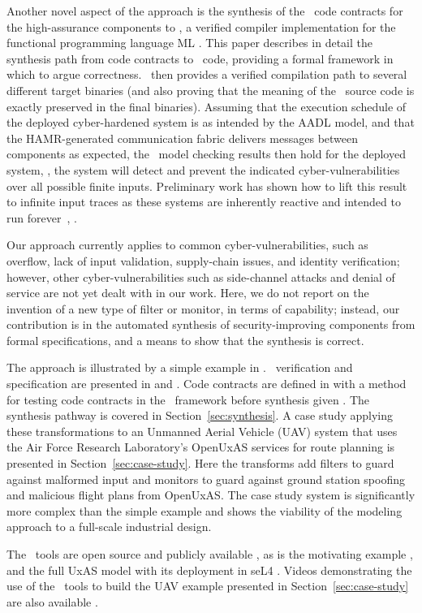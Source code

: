 Another novel aspect of the approach is the synthesis of the \agr\ 
code contracts for the high-assurance components to \ckml, a verified
compiler implementation for the functional programming language
ML \cite{cakeml}. This paper describes in detail the synthesis path
from code contracts to \ckml\ code, providing a formal framework in
which to argue correctness. \ckml\ then provides a verified
compilation path to several different target binaries (and also
proving that the meaning of the \ckml\ source code is exactly
preserved in the final binaries). Assuming that the execution schedule
of the deployed cyber-hardened system is as intended by the AADL
model, and that the HAMR-generated communication fabric delivers
messages between components as expected, the \agr\ model checking
results then hold for the deployed system, \ie, the system will detect
and prevent the indicated cyber-vulnerabilities over all possible
finite inputs. Preliminary work has shown how to lift this result to
infinite input traces as these systems are inherently reactive and
intended to run forever~\cite{case-verified-filter}, \cite{cakeml-space-cost}.

Our approach currently applies to common cyber-vulnerabilities, such
as overflow, lack of input validation, supply-chain issues, and
identity verification; however, other cyber-vulnerabilities such as
side-channel attacks and denial of service are not yet dealt with in
our work.  Here, we do not report on the invention of a new type of
filter or monitor, in terms of capability; instead, our contribution
is in the automated synthesis of security-improving components from
formal specifications, and a means to show that the synthesis is
correct.

The approach is illustrated by a simple example in
. \agr\ verification and specification are
presented in  and .
Code contracts are defined in  with a method
for testing code contracts in the \agr\ framework before synthesis given
\secref{sec:testing}.
The synthesis pathway is covered in Section~\ref{sec:synthesis}. A
case study applying these transformations to an Unmanned Aerial
Vehicle (UAV) system that uses the Air Force Research Laboratory's
OpenUxAS services for route planning is presented in
Section~\ref{sec:case-study}. Here the transforms add filters to guard
against malformed input and monitors to guard against ground station
spoofing and malicious flight plans from OpenUxAS. The case study
system is significantly more complex than the simple example and shows
the viability of the modeling approach to a full-scale industrial
design.

The \brfcs\ tools are open source and publicly
available \cite{fmide}, as is the motivating example \cite{repo}, and
the full UxAS model with its deployment in seL4 \cite{phase2, camkes}.
Videos demonstrating the use of the \brfcs\ tools to build the UAV
example presented in Section~\ref{sec:case-study} are also
available \cite{case}.
